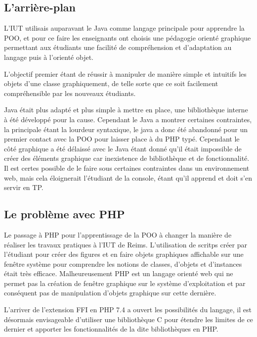 \documentclass[11pt,a4paper,krantz2,11pt,oneside]{krantz}
\begin{document}
\hypertarget{larriuxe8re-plan}{%
\subsection{L'arrière-plan}\label{larriuxe8re-plan}}

L'IUT utilisais auparavant le Java comme langage principale pour apprendre la POO, et pour ce faire les enseignants ont choisis une pédagogie orienté graphique permettant aux étudiants une facilité de compréhension et d'adaptation au langage puis à l'orienté objet.

L'objectif premier étant de réussir à manipuler de manière simple et intuitifs les objets d'une classe graphiquement, de telle sorte que ce soit facilement compréhensible par les nouveaux étudiants.

Java était plus adapté et plus simple à mettre en place, une bibliothèque interne à été développé pour la cause. Cependant le Java a montrer certaines contraintes, la principale étant la lourdeur syntaxique, le java a donc été abandonné pour un premier contact avec la POO pour laisser place à du PHP typé. Cependant le côté graphique a été délaissé avec le Java étant donné qu'il était impossible de créer des éléments graphique car inexistence de bibliothèque et de fonctionnalité. Il est certes possible de le faire sous certaines contraintes dans un environnement web, mais cela éloignerait l'étudiant de la console, étant qu'il apprend et doit s'en servir en TP.

\hypertarget{le-probluxe8me-avec-php}{%
\subsection{Le problème avec PHP}\label{le-probluxe8me-avec-php}}

Le passage à PHP pour l'apprentissage de la POO à changer la manière de réaliser les travaux pratiques à l'IUT de Reims. L'utilisation de scritps créer par l'étudiant pour créer des figures et en faire objets graphiques affichable sur une fenêtre système pour comprendre les notions de classes, d'objets et d'instances était très efficace. Malheureusement PHP est un langage orienté web qui ne permet pas la création de fenêtre graphique sur le système d'exploitation et par conséquent pas de manipulation d'objets graphique sur cette dernière.

L'arriver de l'extension FFI en PHP 7.4 a ouvert les possibilités du langage, il est désormais envisageable d'utiliser une bibliothèque C pour étendre les limites de ce dernier et apporter les fonctionnalités de la dite bibliothèques en PHP.
\end{document}
